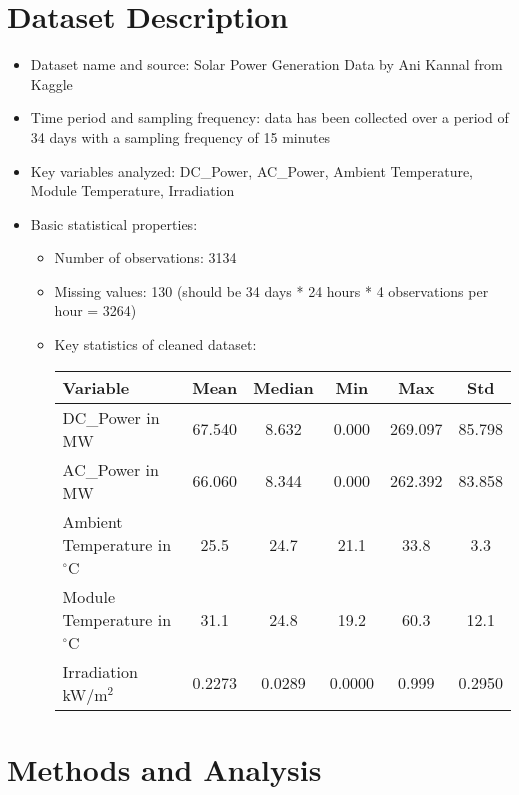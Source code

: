 \documentclass[11pt]{article}
\begin{document}
\section{Dataset Description}
\begin{itemize}
    \item Dataset name and source: Solar Power Generation Data by Ani Kannal from Kaggle
    \item Time period and sampling frequency: data has been collected over a period of 34 days with a sampling frequency of 15 minutes
    \item Key variables analyzed: DC\_Power, AC\_Power, Ambient Temperature, Module Temperature, Irradiation
    \item Basic statistical properties:
    \begin{itemize}
        \item Number of observations: 3134
        \item Missing values: 130 (should be 34 days * 24 hours * 4 observations per hour = 3264)
        \item Key statistics of cleaned dataset: 
            \begin{table}[h!]
            \centering
            \begin{tabular}{lccccc}
            \toprule
            Variable & Mean & Median & Min & Max & Std \\
            \midrule
            DC\_Power in MW & 67.540 & 8.632 & 0.000 & 269.097 & 85.798 \\
            AC\_Power in MW & 66.060 & 8.344 & 0.000 & 262.392 & 83.858 \\
            Ambient Temperature in $^\circ$C & 25.5 & 24.7 & 21.1 & 33.8 & 3.3 \\
            Module Temperature in $^\circ$C & 31.1 & 24.8 & 19.2 & 60.3 & 12.1 \\
            Irradiation kW/m$^2$ & 0.2273 & 0.0289 & 0.0000 & 0.999 & 0.2950 \\
            \bottomrule
            \end{tabular}
            \label{tab:basic_stats}
            \end{table}
    \end{itemize}
\end{itemize}

\section{Methods and Analysis}
\end{document}
